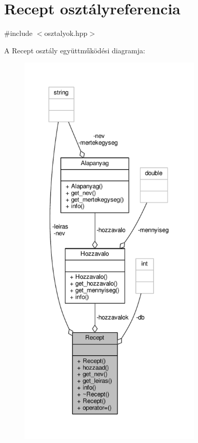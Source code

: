 \hypertarget{classRecept}{}\section{Recept osztályreferencia}
\label{classRecept}


{\ttfamily \#include $<$osztalyok.\+hpp$>$}



A Recept osztály együttműködési diagramja\+:\nopagebreak
\begin{figure}[H]
\begin{center}
\leavevmode
\includegraphics[height=550pt]{classRecept__coll__graph}
\end{center}
\end{figure}
